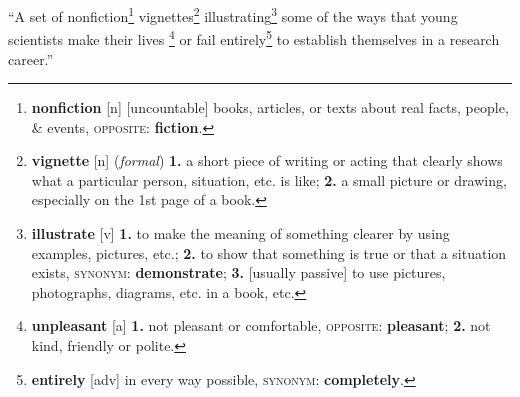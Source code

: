 \documentclass[oneside]{book}
\numberwithin{equation}{section}
\begin{document}
\begin{flushright}
	``A set of nonfiction\footnote{\textbf{nonfiction} [n] [uncountable] books, articles, or texts about real facts, people, \& events, \textsc{opposite}: \textbf{fiction}.} vignettes\footnote{\textbf{vignette} [n] (\textit{formal}) \textbf{1.} a short piece of writing or acting that clearly shows what a particular person, situation, etc. is like; \textbf{2.} a small picture or drawing, especially on the 1st page of a book.} illustrating\footnote{\textbf{illustrate} [v] \textbf{1.} to make the meaning of something clearer by using examples, pictures, etc.; \textbf{2.} to show that something is true or that a situation exists, \textsc{synonym}: \textbf{demonstrate}; \textbf{3.} [usually passive] to use pictures, photographs, diagrams, etc. in a book, etc.} some of the ways that young scientists make their lives \footnote{\textbf{unpleasant} [a] \textbf{1.} not pleasant or comfortable, \textsc{opposite}: \textbf{pleasant}; \textbf{2.} not kind, friendly or polite.} or fail entirely\footnote{\textbf{entirely} [adv] in every way possible, \textsc{synonym}: \textbf{completely}.} to establish themselves in a research career.''
\end{flushright}
\end{document}
